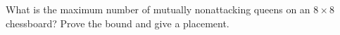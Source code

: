 What is the maximum number of mutually nonattacking queens on an $8\times8$ chessboard? Prove the bound and give a placement.
